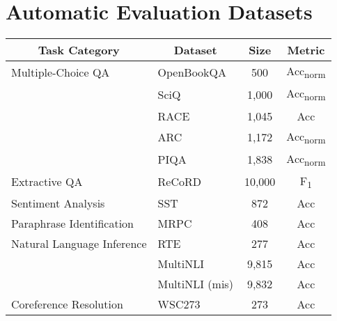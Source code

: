 \documentclass[11pt]{article}
\begin{document}
\section{Automatic Evaluation Datasets}
\label{sec:auto_eval_datasets}
\begin{table*}[t]
\centering
\small
\begin{tabular}{@{}llcc@{}}
\toprule
\multicolumn{1}{c}{Task Category} & \multicolumn{1}{c}{Dataset} & Size             & Metric                  \\ \midrule
Multiple-Choice QA           & OpenBookQA \cite{mihaylov-etal-2018-suit}                 & \phantom{00}500  & Acc\textsubscript{norm} \\
                             & SciQ \cite{welbl-etal-2017-crowdsourcing}                        & \phantom{0}1,000 & Acc\textsubscript{norm} \\
                             & RACE \cite{lai-etal-2017-race}                       & \phantom{0}1,045 & Acc                     \\
                             & ARC \cite{DBLP:journals/corr/abs-1803-05457}                       & \phantom{0}1,172 & Acc\textsubscript{norm} \\
                             & PIQA \cite{DBLP:conf/aaai/BiskZLGC20}                        & \phantom{0}1,838 & Acc\textsubscript{norm} \\ \midrule
Extractive QA                & ReCoRD \cite{DBLP:journals/corr/abs-1810-12885}                      & 10,000           & F\textsubscript{1}      \\ \midrule
Sentiment Analysis            & SST \cite{socher-etal-2013-recursive}                        & \phantom{00}872  & Acc                     \\ \midrule
Paraphrase Identification    & MRPC \cite{dolan-brockett-2005-automatically}                       & \phantom{00}408  & Acc                     \\ \midrule
Natural Language Inference   & RTE \cite{DBLP:conf/iclr/WangSMHLB19}                         & \phantom{00}277  & Acc                     \\ 
                             & MultiNLI \cite{williams-etal-2018-broad}                        & \phantom{0}9,815 & Acc                     \\
                             & MultiNLI (mis) \cite{williams-etal-2018-broad}                & \phantom{0}9,832 & Acc                     \\ \midrule
Coreference Resolution       & WSC273 \cite{levesque2012winograd}                         & \phantom{00}273  & Acc                     \\

\end{tabular}
\end{table*}
\end{document}
